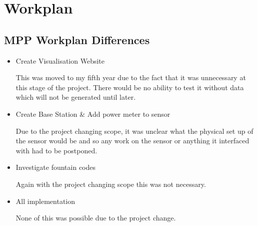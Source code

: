 \section{Workplan}\label{workplan}

\subsection{MPP Workplan Differences}

\begin{itemize}

\item Create Visualisation Website

	This was moved to my fifth year due to the fact that it was unnecessary at this stage of the project. There would be no ability to test it without data which will not be generated until later.

\item Create Base Station \& Add power meter to sensor

	Due to the project changing scope, it was unclear what the physical set up of the sensor would be and so any work on the sensor or anything it interfaced with had to be postponed. 

\item Investigate fountain codes
	
	Again with the project changing scope this was not necessary. 

\item All implementation

	None of this was possible due to the project change. 

\end{itemize}






